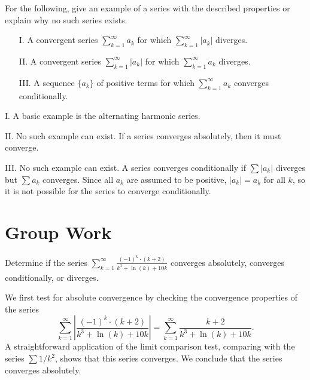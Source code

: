\documentclass[noauthor]{ximera}
\begin{document}
\begin{problem}
For the following, give an example of a series with the described properties or explain why no such series exists.

\begin{itemize}
\item[I.] A convergent series $\sum_{k=1}^{\infty} a_k$ for which $\sum_{k=1}^{\infty} |a_k|$ diverges.

\item[II.] A convergent series $\sum_{k=1}^{\infty} |a_k|$ for which $\sum_{k=1}^{\infty} a_k$ diverges.

\item[III.] A sequence $\{a_k\}$ of positive terms for which $\sum_{k=1}^{\infty} a_k$ converges conditionally.

\end{itemize}


\begin{freeResponse}
I. A basic example is the alternating harmonic series.

II. No such example can exist. If a series converges absolutely, then it must converge.

III. No such example can exist. A series converges conditionally if $\sum |a_k|$ diverges but $\sum a_k$ converges. Since all $a_k$ are assumed to be positive, $|a_k| = a_k$ for all $k$, so it is not possible for the series to converge conditionally.
\end{freeResponse}
\end{problem}

\section{Group Work}

\begin{problem}
Determine if the series $\sum_{k=1}^\infty \frac{(-1)^k \cdot  (k+2)}{k^3+\ln(k) +10k}$ converges absolutely, converges conditionally, or diverges.

\begin{freeResponse}
We first test for absolute convergence by checking the convergence properties of the series 
$$
\sum_{k=1}^\infty \left|\frac{(-1)^k \cdot  (k+2)}{k^3+\ln(k) +10k}\right| = \sum_{k=1}^\infty \frac{k+2}{k^3+\ln(k) +10k}.
$$
A straightforward application of the limit comparison test, comparing with the series $\sum 1/k^2$, shows that this series converges. We conclude that the series converges absolutely. 
\end{freeResponse}
\end{problem}
\end{document}
